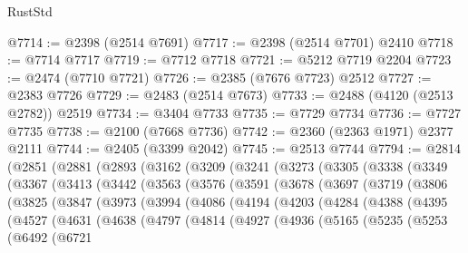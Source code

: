 \begin{lexlean}{RustStd}
\begin{coremodule}
{\begin{coremodule}
{{{{{{{{{{{{{{{{{{{{{{{{{{{{{{{{{{{{{{{{{{{{{{{{{{@7714 := @2398 (@2514 @7691)
@7717 := @2398 (@2514 @7701) @2410
@7718 := @7714 @7717
@7719 := @7712 @7718
@7721 := @5212 @7719 @2204
@7723 := @2474 (@7710 @7721)
@7726 := @2385 (@7676 @7723) @2512
@7727 := @2383 @7726
@7729 := @2483 (@2514 @7673)
@7733 := @2488 (@4120 (@2513 @2782)) @2519
@7734 := @3404 @7733
@7735 := @7729 @7734
@7736 := @7727 @7735
@7738 := @2100 (@7668 @7736)
@7742 := @2360 (@2363 @1971) @2377 @2111
@7744 := @2405 (@3399 @2042)
@7745 := @2513 @7744
@7794 := @2814
    (@2851
      (@2881
        (@2893
          (@3162
            (@3209
              (@3241
                (@3273
                  (@3305
                    (@3338
                      (@3349
                        (@3367
                          (@3413
                            (@3442
                              (@3563
                                (@3576
                                  (@3591
                                    (@3678
                                      (@3697
                                        (@3719
                                          (@3806
                                            (@3825
                                              (@3847
                                                (@3973
                                                  (@3994
                                                    (@4086
                                                      (@4194
                                                        (@4203
                                                          (@4284
                                                            (@4388
                                                              (@4395
                                                                (@4527
                                                                  (@4631
                                                                    (@4638
                                                                      (@4797
                                                                        (@4814
                                                                          (@4927
                                                                            (@4936
                                                                              (@5165
                                                                                (@5235
                                                                                  (@5253
                                                                                    (@6492
                                                                                      (@6721
}}}}}}}}}}}}}}}}}}}}}}}}}}}}}}}}}}}}}}}}}}}}}}}}}}
\end{coremodule}}
\end{coremodule}
\end{lexlean}

